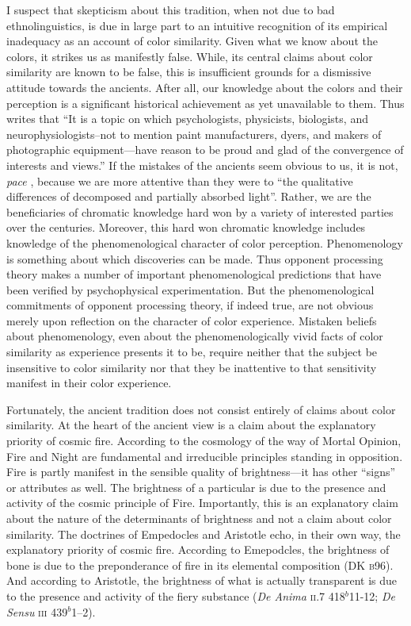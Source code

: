 I suspect that skepticism about this tradition, when not due to bad ethnolinguistics, is due in large part to an intuitive recognition of its empirical inadequacy as an account of color similarity. Given what we know about the colors, it strikes us as manifestly false. While, its central claims about color similarity are known to be false, this is insufficient grounds for a dismissive attitude towards the ancients. After all, our knowledge about the colors and their perception is a significant historical achievement as yet unavailable to them. Thus \citet[291]{Broackes:2010uq} writes that ``It is a topic on which psychologists, physicists, biologists, and neurophysiologists--not to mention paint manufacturers, dyers, and makers of photographic equipment---have reason to be proud and glad of the convergence of interests and views.'' If the mistakes of the ancients seem obvious to us, it is not, \emph{pace} \citet[162]{Platnauer:1921bh}, because we are more attentive than they were to ``the qualitative differences of decomposed and partially absorbed light''. Rather, we are the beneficiaries of chromatic knowledge hard won by a variety of interested parties over the centuries. Moreover, this hard won chromatic knowledge includes knowledge of the phenomenological character of color perception. Phenomenology is something about which discoveries can be made. Thus opponent processing theory makes a number of important phenomenological predictions that have been verified by psychophysical experimentation. But the phenomenological commitments of opponent processing theory, if indeed true, are not obvious merely upon reflection on the character of color experience. Mistaken beliefs about phenomenology, even about the phenomenologically vivid facts of color similarity as experience presents it to be, require neither that the subject be insensitive to color similarity nor that they be inattentive to that sensitivity manifest in their color experience. 

Fortunately, the ancient tradition does not consist entirely of claims about color similarity. At the heart of the ancient view is a claim about the explanatory priority of cosmic fire. According to the cosmology of the way of Mortal Opinion, Fire and Night are fundamental and irreducible principles standing in opposition. Fire is partly manifest in the sensible quality of brightness---it has other ``signs'' or attributes as well. The brightness of a particular is due to the presence and activity of the cosmic principle of Fire. Importantly, this is an explanatory claim about the nature of the determinants of brightness and not a claim about color similarity. The doctrines of Empedocles and Aristotle echo, in their own way, the explanatory priority of cosmic fire. According to Emepodcles, the brightness of bone is due to the preponderance of fire in its elemental composition (DK \textsc{b}96). And according to Aristotle, the brightness of what is actually transparent is due to the presence and activity of the fiery substance (\emph{De Anima} \textsc{ii}.7 418\( ^{b} \)11-12; \emph{De Sensu} \textsc{iii} 439\( ^{b} \)1--2). 

